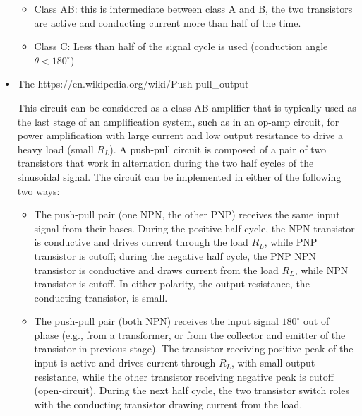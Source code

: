 \documentclass{article}
\begin{document}
\begin{itemize}
\begin{itemize}
\item Class AB: this is intermediate between class A and B, the two 
  transistors are active and conducting current more than half of the
  time.

\item Class C: Less than half of the signal cycle is used (conduction angle
  $\theta<180^\circ$)

\end{itemize}

\item The 
  {https://en.wikipedia.org/wiki/Push-pull_output}

  This circuit can be considered as a class AB amplifier that is 
  typically used as the last stage of an amplification system, such as 
  in an op-amp circuit, for power amplification with large current and
  low output resistance to drive a heavy load (small $R_L$). A push-pull
  circuit is composed of a pair of two transistors that work in alternation
  during the two half cycles of the sinusoidal signal. The circuit can be 
  implemented in either of the following two ways:
  \begin{itemize}
  \item The push-pull pair (one NPN, the other PNP) receives the same 
    input signal from their bases. During the positive half cycle, the 
    NPN transistor is conductive and drives current through the load 
    $R_L$, while PNP transistor is cutoff; during the negative half cycle, 
    the PNP NPN transistor is conductive and draws current from the load 
    $R_L$, while NPN transistor is cutoff. In either polarity, the output 
    resistance, the conducting transistor, is small.

  \item The push-pull pair (both NPN) receives the input signal $180^\circ$ 
    out of phase (e.g., from a transformer, or from the collector and emitter
    of the transistor in previous stage). The transistor receiving positive
    peak of the input is active and drives current through $R_L$, with small
    output resistance, while the other transistor receiving negative peak 
    is cutoff (open-circuit). During the next half cycle, the two transistor 
    switch roles with the conducting transistor drawing current from the load.
    
  \end{itemize}






\end{itemize}
\end{document}
